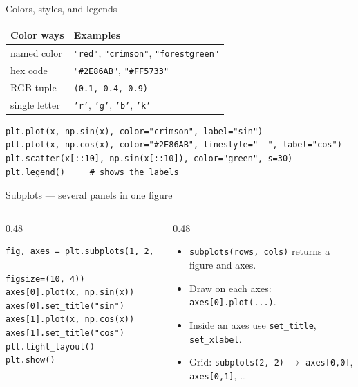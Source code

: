 \documentclass[aspectratio=169]{beamer}
\begin{document}
\begin{frame}[fragile]{Colors, styles, and legends}
  \begin{table}
    \small
    \begin{tabular}{@{}ll@{}}
      \toprule
      Color ways & Examples \\
      \midrule
      named color & \texttt{"red"}, \texttt{"crimson"}, \texttt{"forestgreen"} \\
      hex code & \texttt{"\#2E86AB"}, \texttt{"\#FF5733"} \\
      RGB tuple & \texttt{(0.1, 0.4, 0.9)} \\
      single letter & \texttt{'r'}, \texttt{'g'}, \texttt{'b'}, \texttt{'k'} \\
      \bottomrule
    \end{tabular}
  \end{table}
  \vspace{0.3cm}
  \begin{lstlisting}
plt.plot(x, np.sin(x), color="crimson", label="sin")
plt.plot(x, np.cos(x), color="#2E86AB", linestyle="--", label="cos")
plt.scatter(x[::10], np.sin(x[::10]), color="green", s=30)
plt.legend()     # shows the labels
  \end{lstlisting}
\end{frame}

\begin{frame}[fragile]{Subplots --- several panels in one figure}
  \begin{columns}[T]
    \begin{column}{0.48\textwidth}
      \begin{lstlisting}
fig, axes = plt.subplots(1, 2,
                         figsize=(10, 4))
axes[0].plot(x, np.sin(x))
axes[0].set_title("sin")
axes[1].plot(x, np.cos(x))
axes[1].set_title("cos")
plt.tight_layout()
plt.show()
      \end{lstlisting}
    \end{column}
    \begin{column}{0.48\textwidth}
      \begin{itemize}
        \item \texttt{subplots(rows, cols)} returns a figure and axes.
        \item Draw on each axes: \texttt{axes[0].plot(...)}.
        \item Inside an axes use \texttt{set\_title}, \texttt{set\_xlabel}.
        \item Grid: \texttt{subplots(2, 2)} $\rightarrow$ \texttt{axes[0,0]}, \texttt{axes[0,1]}, \ldots
      \end{itemize}
    \end{column}
  \end{columns}
\end{frame}
\end{document}
